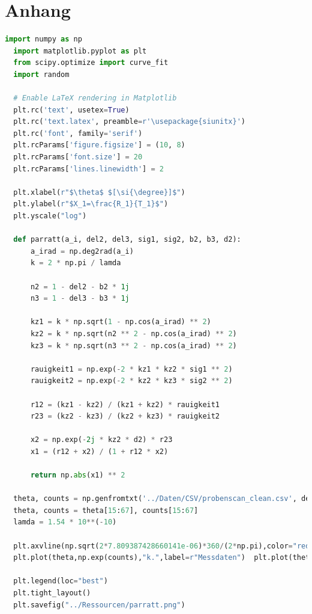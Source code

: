\documentclass[12pt]{article}
\begin{document}
\section{Anhang}\label{sec:anhang}
\begin{lstlisting}[language=Python, caption={Parratt Implementation}, label={lst:python_code}, basicstyle=\footnotesize]  import numpy as np
  import matplotlib.pyplot as plt
  from scipy.optimize import curve_fit
  import random
  
  # Enable LaTeX rendering in Matplotlib
  plt.rc('text', usetex=True)
  plt.rc('text.latex', preamble=r'\usepackage{siunitx}')
  plt.rc('font', family='serif')
  plt.rcParams['figure.figsize'] = (10, 8)
  plt.rcParams['font.size'] = 20
  plt.rcParams['lines.linewidth'] = 2
  
  plt.xlabel(r"$\theta$ $[\si{\degree}]$")
  plt.ylabel(r"$X_1=\frac{R_1}{T_1}$")
  plt.yscale("log")
  
  def parratt(a_i, del2, del3, sig1, sig2, b2, b3, d2):
      a_irad = np.deg2rad(a_i)
      k = 2 * np.pi / lamda
  
      n2 = 1 - del2 - b2 * 1j
      n3 = 1 - del3 - b3 * 1j
  
      kz1 = k * np.sqrt(1 - np.cos(a_irad) ** 2)
      kz2 = k * np.sqrt(n2 ** 2 - np.cos(a_irad) ** 2)
      kz3 = k * np.sqrt(n3 ** 2 - np.cos(a_irad) ** 2)
  
      rauigkeit1 = np.exp(-2 * kz1 * kz2 * sig1 ** 2)
      rauigkeit2 = np.exp(-2 * kz2 * kz3 * sig2 ** 2)
  
      r12 = (kz1 - kz2) / (kz1 + kz2) * rauigkeit1
      r23 = (kz2 - kz3) / (kz2 + kz3) * rauigkeit2
  
      x2 = np.exp(-2j * kz2 * d2) * r23
      x1 = (r12 + x2) / (1 + r12 * x2)
  
      return np.abs(x1) ** 2
  
  theta, counts = np.genfromtxt('../Daten/CSV/probenscan_clean.csv', delimiter=',', unpack=True)
  theta, counts = theta[15:67], counts[15:67]
  lamda = 1.54 * 10**(-10)
  
  plt.axvline(np.sqrt(2*7.809387428660141e-06)*360/(2*np.pi),color="red",label=r"Bestimmter kritischer Winkel von Silizium")
  plt.plot(theta,np.exp(counts),"k.",label=r"Messdaten")  plt.plot(theta,np.exp(parratt(theta,7.809387428660141e-06 ,6.462924555141031e-06 ,2.084494881704885e-09 ,8.274921568775992e-10 ,1.807969456700064e-07 ,9.084631342956966e-08 ,4.876432802470713e-08)),label=r"Parratt-Reflektivitaet")

  plt.legend(loc="best")
  plt.tight_layout()
  plt.savefig("../Ressourcen/parratt.png")
  \end{lstlisting}
\end{document}
